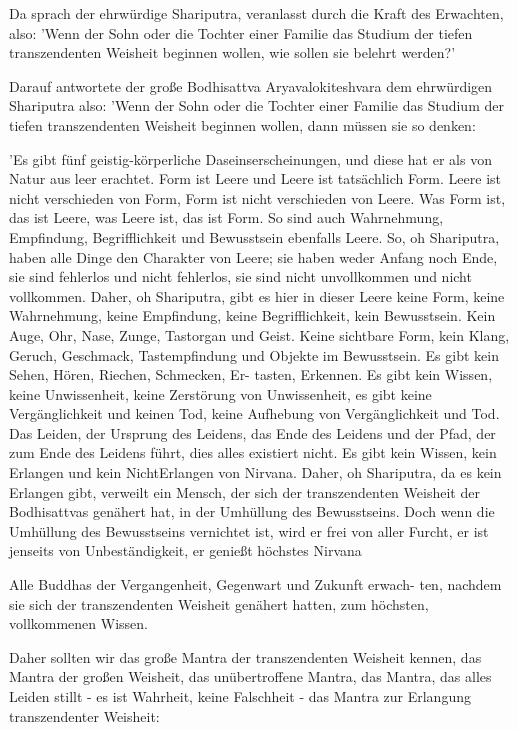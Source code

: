\documentclass[10pt,a4paper]{article}
\begin{document}
\vskip 4pt
Da sprach der ehrwürdige Shariputra, veranlasst durch die Kraft des
Erwachten, also: 'Wenn der Sohn oder die Tochter einer Familie das Studium
der tiefen transzendenten Weisheit beginnen wollen, wie sollen sie belehrt
werden?'

\vskip 4pt
Darauf antwortete der große Bodhisattva Aryavalokiteshvara dem ehrwürdigen
Shariputra also: 'Wenn der Sohn oder die Tochter einer Familie das Studium
der tiefen transzendenten Weisheit beginnen wollen, dann müssen sie so
denken:

\vskip 4pt
'Es gibt fünf geistig-körperliche Daseinserscheinungen, und diese hat er als
von Natur aus leer erachtet. Form ist Leere und Leere ist tatsächlich Form.
Leere ist nicht verschieden von Form, Form ist nicht verschieden von Leere.
Was Form ist, das ist Leere, was Leere ist, das ist Form. So sind auch
Wahrnehmung, Empfindung, Begrifflichkeit und Bewusstsein ebenfalls Leere.
So, oh Shariputra, haben alle Dinge den Charakter von Leere; sie haben weder
Anfang noch Ende, sie sind fehlerlos und nicht fehlerlos, sie sind nicht
unvollkommen und nicht vollkommen. Daher, oh Shariputra, gibt es hier in
dieser Leere keine Form, keine Wahrnehmung, keine Empfindung, keine
Begrifflichkeit, kein Bewusstsein. Kein Auge, Ohr, Nase, Zunge, Tastorgan und
Geist. Keine sichtbare Form, kein Klang, Geruch, Geschmack, Tastempfindung
und Objekte im Bewusstsein. Es gibt kein Sehen, Hören, Riechen, Schmecken,
Er- tasten, Erkennen. Es gibt kein Wissen, keine Unwissenheit, keine
Zerstörung von Unwissenheit, es gibt keine Vergänglichkeit und keinen Tod,
keine Aufhebung von Vergänglichkeit und Tod. Das Leiden, der Ursprung des
Leidens, das Ende des Leidens und der Pfad, der zum Ende des Leidens führt,
dies alles existiert nicht. Es gibt kein Wissen, kein Erlangen und kein NichtErlangen von Nirvana. Daher, oh Shariputra, da es kein Erlangen gibt, verweilt
ein Mensch, der sich der transzendenten Weisheit der Bodhisattvas genähert
hat, in der Umhüllung des Bewusstseins. Doch wenn die Umhüllung des
Bewusstseins vernichtet ist, wird er frei von aller Furcht, er ist jenseits von
Unbeständigkeit, er genießt höchstes Nirvana 

\vskip 4pt
Alle Buddhas der Vergangenheit, Gegenwart und Zukunft erwach- ten,
nachdem sie sich der transzendenten Weisheit genähert hatten, zum höchsten,
vollkommenen Wissen.

\vskip 4pt
Daher sollten wir das große Mantra der transzendenten Weisheit kennen, das
Mantra der großen Weisheit, das unübertroffene Mantra, das Mantra, das alles
Leiden stillt - es ist Wahrheit, keine Falschheit - das Mantra zur Erlangung
transzendenter Weisheit:
\end{document}
